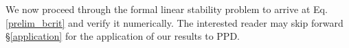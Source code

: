 \documentclass[iop]{emulateapj}
\begin{document}
We now proceed through the formal linear stability problem to arrive
at Eq. \ref{prelim_bcrit} and verify it numerically. The interested 
reader may skip forward \S\ref{application} for the application of our
results to PPD.     





 


\appendix




\end{document}
